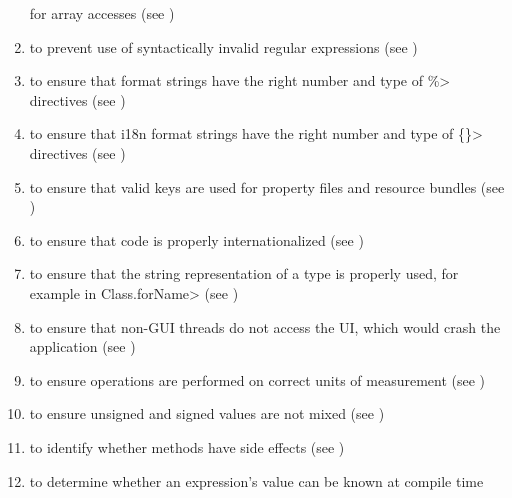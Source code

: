 \begin{enumerate}
   for array accesses
  (see )
\item
   to prevent use of syntactically
  invalid regular expressions (see )
\item
   to ensure that format
  strings have the right number and type of \<\%> directives (see
  )
\item
  to ensure that i18n format strings have the right number and type of
  \<\{\}> directives (see )
\item
   to ensure that valid
  keys are used for property files and resource bundles (see
  )
\item
   to
  ensure that code is properly internationalized (see
  )
\item
   to ensure that the
  string representation of a type is properly used, for example in
  \<Class.forName> (see )
\item
   to ensure that non-GUI
  threads do not access the UI, which would crash the application
  (see )
\item
   to ensure operations are
  performed on correct units of measurement
  (see )
\item
   to
  ensure unsigned and signed values are not mixed
  (see )
\item
   to identify whether
  methods have side effects (see )
\item
   to determine
  whether an expression's value can be known at compile time

\end{enumerate}
